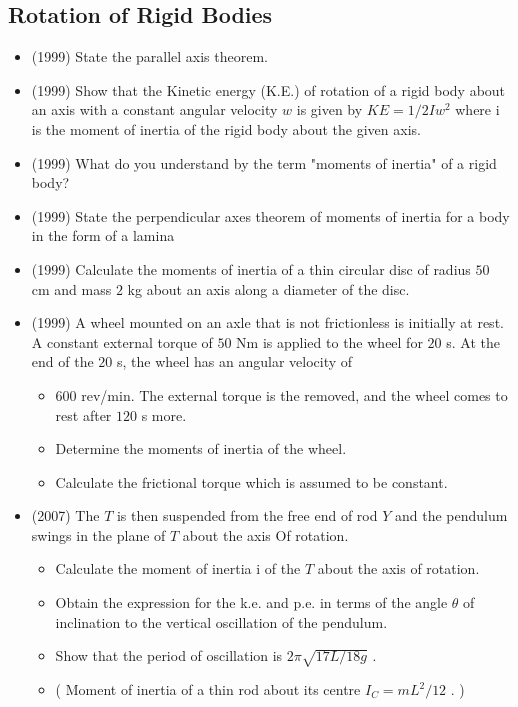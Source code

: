 \documentclass{article}
\begin{document}
\subsection{Rotation of Rigid Bodies}
\begin{itemize}
\item (1999)  State the parallel axis theorem.
\item (1999)  Show that the Kinetic energy (K.E.) of rotation of a rigid body about an axis with a constant angular velocity $ w$ is given by $ KE =1/2Iw^{2}$ where i is the moment of inertia of the rigid body about the given axis.
\item (1999)  What do you understand by the term "moments of inertia" of a rigid body?
\item (1999)  State the perpendicular axes theorem of moments of inertia for a body in the form of a lamina
\item (1999)  Calculate the moments of inertia of a thin circular disc of radius $ 50$ cm and mass $ 2$ kg about an axis along a diameter of the disc.
\item (1999)  A wheel mounted on an axle that is not frictionless is initially at rest. A constant external torque of $ 50$ Nm is applied to the wheel for $ 20$ s. At the end of the $ 20$ s, the wheel has an angular velocity of
 \begin{itemize}
\item $ 600$ rev/min. The external torque is the removed, and the wheel comes to rest after $ 120$ s more.
\item Determine the moments of inertia of the wheel.
\item Calculate the frictional torque which is assumed to be constant. 
\end{itemize}
\item (2007)  The $ T$ is then suspended from the free end of rod $ Y$ and the pendulum swings in the plane of $ T$ about the axis Of rotation.
 \begin{itemize}
\item Calculate the moment of inertia i of the $ T$ about the axis of rotation. 
\item Obtain the expression for the k.e. and p.e. in terms of the angle $ \theta $ of inclination to the vertical oscillation of the pendulum. 
\item Show that the period of oscillation is $ 2\pi\sqrt{17L/18g}$ . 
\item ( Moment of inertia of a thin rod about its centre $ I_{C}=mL^{2}/12$ . )
\end{itemize}

\end{itemize}
\end{document}

